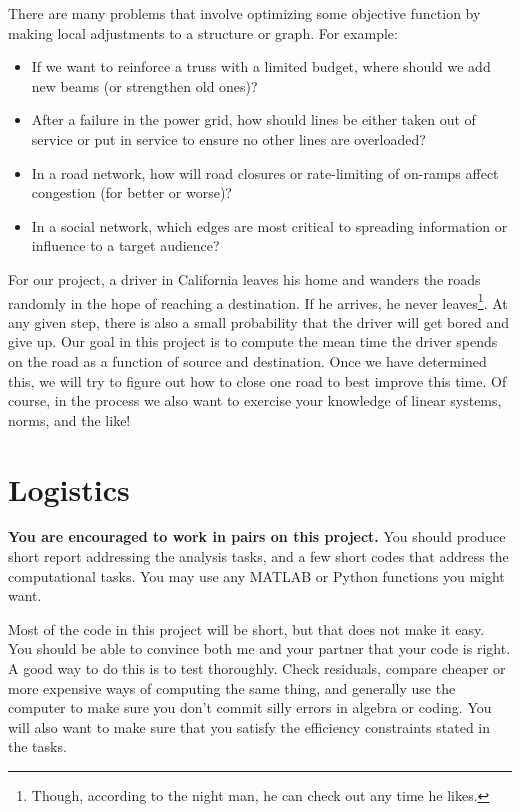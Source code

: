 \documentclass[12pt, leqno]{article}
\begin{document}

There are many problems that involve optimizing some objective
function by making local adjustments to a structure or graph.
For example:
\begin{itemize}
\item If we want to reinforce a truss with a limited budget, where
  should we add new beams (or strengthen old ones)?
\item After a failure in the power grid, how should lines be either
  taken out of service or put in service to ensure no other lines
  are overloaded?
\item In a road network, how will road closures or rate-limiting of
  on-ramps affect congestion (for better or worse)?
\item In a social network, which edges are most critical to
  spreading information or influence to a target audience?
\end{itemize}

For our project, a driver in California leaves his home and wanders
the roads randomly in the hope of reaching a destination.  If he
arrives, he never leaves\footnote{Though, according to the night man,
  he can check out any time he likes.}.  At any given step, there is
also a small probability that the driver will get bored and give up.
Our goal in this project is to compute the mean time the driver spends
on the road as a function of source and destination.  Once we have
determined this, we will try to figure out how to close one road to
best improve this time.  Of course, in the process we also want to
exercise your knowledge of linear systems, norms, and the like!

\section*{Logistics}

{\bf You are encouraged to work in pairs on this project.}  You should
produce short report addressing the analysis tasks, and a few
short codes that address the computational tasks.  You may
use any MATLAB or Python functions you might want.

Most of the code in this project will be short, but that does not make
it easy.  You should be able to convince both me and your partner that
your code is right.  A good way to do this is to test thoroughly.
Check residuals, compare cheaper or more expensive ways of computing
the same thing, and generally use the computer to make sure you don't
commit silly errors in algebra or coding.  You will also want to make
sure that you satisfy the efficiency constraints stated in the tasks.
\end{document}
